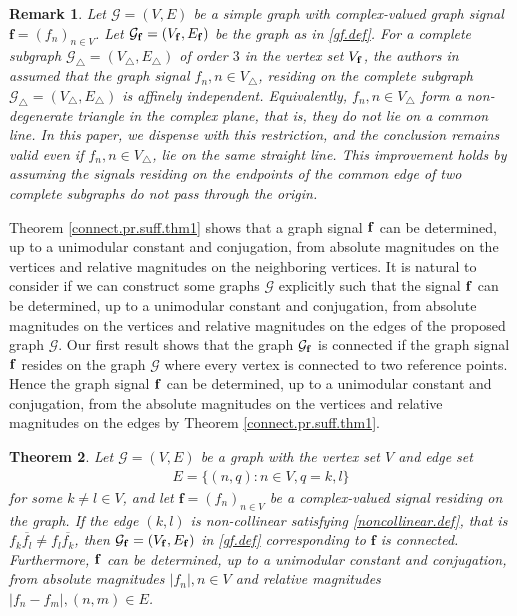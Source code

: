 \documentclass[12pt,oneside,reqno]{amsart}
\newtheorem{theorem}{Theorem}[section]
\newtheorem{remark}[theorem]{Remark}%
\numberwithin{equation}{section}
\begin{document}
\begin{remark} 
    Let $\mathcal{G}=(V,E)$ be a simple graph with complex-valued graph signal $\mathbf{f}=(f_n)_{n\in V}$. Let $\mathcal{G}_{\bf f} = (V_{\bf f},E_{\bf f})$ be the graph as in \eqref{gf.def}.
    For a complete subgraph $\mathcal{G}_\triangle=(V_\triangle,E_\triangle)$ of order $3$ in the vertex set $V_{\bf f}$, the authors in \cite{chen2022phase} assumed that the graph signal $f_n, n\in V_\triangle$, residing on the complete subgraph $\mathcal{G}_\triangle=(V_\triangle,E_\triangle)$ is affinely independent.  Equivalently,  $f_n, n\in V_\triangle$ form a non-degenerate triangle in the complex plane, that is, they do not lie on a common line. In this paper, we dispense with this restriction, and the conclusion remains valid even if $f_n, n\in V_\triangle$, lie on the same straight line.   This improvement holds by assuming the signals residing on the endpoints of the common edge of two complete subgraphs  do not pass through the origin. %
\end{remark}

	
	
	
	Theorem \ref{connect.pr.suff.thm1} shows that  a graph signal $\bf f$ can be determined, up to a unimodular constant and conjugation, from absolute magnitudes on the vertices and relative magnitudes on the neighboring vertices.  It is natural to consider if we can construct some graphs $\mathcal G$ explicitly  such that the signal $\bf f$ can be determined, up to a unimodular constant and conjugation, from absolute magnitudes on the vertices and relative magnitudes on the edges of the proposed graph $
	\mathcal G$.  Our first result shows that the graph ${\mathcal G}_{\bf f}$ is connected if the graph signal $\bf f$ resides on the graph $\mathcal G$ where every vertex is connected to two reference points. Hence the graph signal $\bf f$  can be determined, up to a unimodular constant and conjugation, from the absolute magnitudes on the vertices and relative magnitudes on the edges  by Theorem \ref{connect.pr.suff.thm1}.
	
	\begin{theorem}\label{thm.reference}
		Let $\mathcal{G} = (V, E)$ be a graph with the vertex set $V$ and edge set
		\begin{align*}
			E=\{(n,q):n\in V,q=k,l \}
		\end{align*}
		for some $k\ne l\in V$, and let
		$\mathbf{f}= (f_n)_{n\in V}$ be a complex-valued signal residing on the graph. If the edge $(k, l)$ is non-collinear satisfying \eqref{noncollinear.def}, that is  $f_k\overline{f_l}\neq f_l \overline{f_k}$, then $\mathcal{G}_{\bf f} = (V_{\bf f}, E_{\bf f})$ in \eqref{gf.def} corresponding to  $\mathbf{f}$ is connected. Furthermore,  $\bf f$ can be determined, up to a unimodular constant and conjugation, from absolute magnitudes $ |f_n|, n\in V $ and relative magnitudes $|f_n-f_m|, (n,m)\in E$.
	\end{theorem}
	
\end{document}

